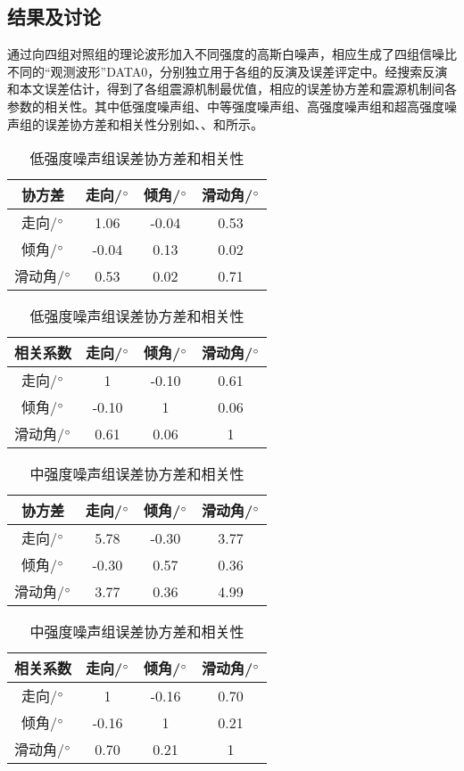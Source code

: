 \subsection{结果及讨论}
通过向四组对照组的理论波形加入不同强度的高斯白噪声，相应生成了四组信噪比不同的“观测波形”DATA0，分别独立用于各组的反演及误差评定中。经搜索反演和本文误差估计，得到了各组震源机制最优值，相应的误差协方差和震源机制间各参数的相关性。其中低强度噪声组、中等强度噪声组、高强度噪声组和超高强度噪声组的误差协方差和相关性分别如、、和所示。
\begin{table}[ht]
\centering
\caption{低强度噪声组误差协方差和相关性}
\label{tab3_02}
    \begin{tabular}{c c c c}
    \hline
    协方差 & 走向/$^\circ$ & 倾角/$^\circ$ & 滑动角/$^\circ$ \\
    \hline
	走向/$^\circ$ 		&1.06	 	&-0.04		&0.53\\
	倾角/$^\circ$		&-0.04		&0.13		&0.02\\
	滑动角/$^\circ$	&0.53		&0.02		&0.71\\
    \hline
    \end{tabular}
    \begin{tabular}{c c c c}
    \hline
    相关系数 & 走向/$^\circ$ & 倾角/$^\circ$ & 滑动角/$^\circ$ \\
    \hline
	走向/$^\circ$ 		&1 			&-0.10		&0.61\\
	倾角/$^\circ$		&-0.10		&1			&0.06\\
	滑动角/$^\circ$	&0.61		&0.06		&1\\
    \hline
    \end{tabular}
\end{table}

\begin{table}[ht]
\centering
\caption{中强度噪声组误差协方差和相关性}
\label{tab3_03}
    \begin{tabular}{c c c c}
    \hline
    协方差 & 走向/$^\circ$ & 倾角/$^\circ$ & 滑动角/$^\circ$ \\
    \hline
	走向/$^\circ$ 		&5.78		&-0.30		&3.77\\
	倾角/$^\circ$		&-0.30		&0.57		&0.36\\
	滑动角/$^\circ$	&3.77		&0.36		&4.99\\
    \hline
    \end{tabular}
    \begin{tabular}{c c c c}
    \hline
    相关系数 & 走向/$^\circ$ & 倾角/$^\circ$ & 滑动角/$^\circ$ \\
    \hline
	走向/$^\circ$ 		&1 			&-0.16		&0.70\\
	倾角/$^\circ$		&-0.16		&1			&0.21\\
	滑动角/$^\circ$	&0.70		&0.21		&1\\
    \hline
    \end{tabular}
\end{table}

